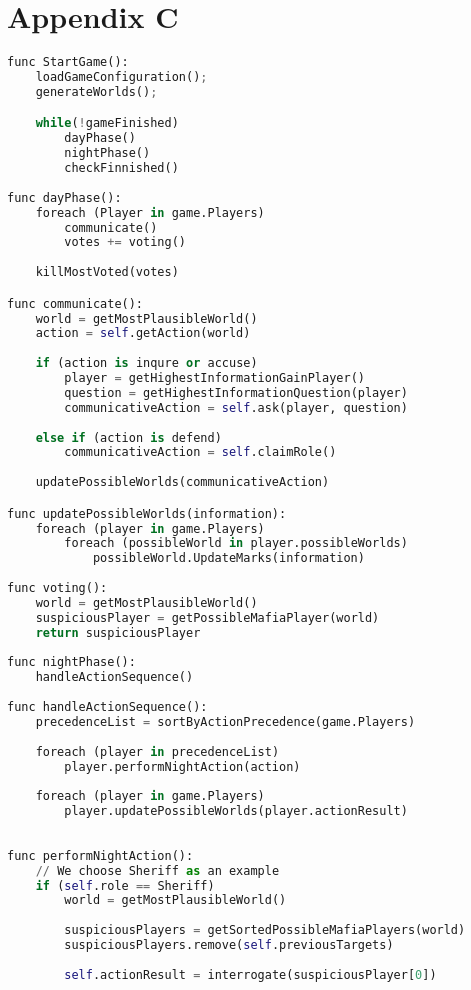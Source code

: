 \section{Appendix C}
\begin{lstlisting}[language=Python, xleftmargin=0.5cm]
func StartGame():
	loadGameConfiguration();
	generateWorlds();

	while(!gameFinished)
		dayPhase()
		nightPhase()
		checkFinnished()
	
func dayPhase():
	foreach (Player in game.Players)
		communicate()
		votes += voting()
	
	killMostVoted(votes)

func communicate():
	world = getMostPlausibleWorld()
	action = self.getAction(world)
	
	if (action is inqure or accuse)
		player = getHighestInformationGainPlayer()
		question = getHighestInformationQuestion(player)
		communicativeAction = self.ask(player, question)
	
	else if (action is defend)
		communicativeAction = self.claimRole()
	
	updatePossibleWorlds(communicativeAction)

func updatePossibleWorlds(information):
    foreach (player in game.Players)
    	foreach (possibleWorld in player.possibleWorlds)
			possibleWorld.UpdateMarks(information)
	
func voting():
	world = getMostPlausibleWorld()
	suspiciousPlayer = getPossibleMafiaPlayer(world)
	return suspiciousPlayer
	
func nightPhase():
	handleActionSequence()
	
func handleActionSequence():
	precedenceList = sortByActionPrecedence(game.Players)
	
	foreach (player in precedenceList)
		player.performNightAction(action)
	
	foreach (player in game.Players)
		player.updatePossibleWorlds(player.actionResult)
	
	
func performNightAction():
	// We choose Sheriff as an example
	if (self.role == Sheriff)
		world = getMostPlausibleWorld()
	
		suspiciousPlayers = getSortedPossibleMafiaPlayers(world)
		suspiciousPlayers.remove(self.previousTargets)
	
		self.actionResult = interrogate(suspiciousPlayer[0])
\end{lstlisting}